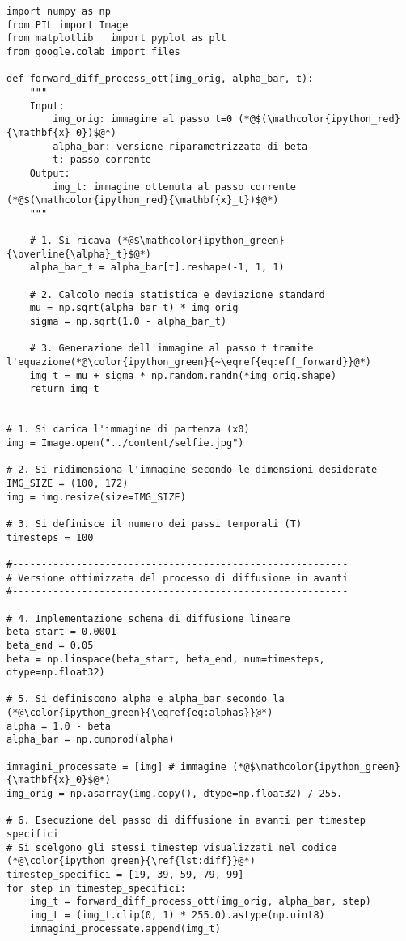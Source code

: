 \begin{lstlisting}[language=iPython,caption=Diffusione in avanti ottimizzata. Codice adattato da~\cite{nain2022},label=lst:diff_ott]
import numpy as np                 
from PIL import Image             
from matplotlib   import pyplot as plt   
from google.colab import files     
    
def forward_diff_process_ott(img_orig, alpha_bar, t):
    """
    Input:
        img_orig: immagine al passo t=0 (*@$(\mathcolor{ipython_red}{\mathbf{x}_0})$@*)
        alpha_bar: versione riparametrizzata di beta
        t: passo corrente 
    Output:
        img_t: immagine ottenuta al passo corrente (*@$(\mathcolor{ipython_red}{\mathbf{x}_t})$@*)
    """
    
    # 1. Si ricava (*@$\mathcolor{ipython_green}{\overline{\alpha}_t}$@*)
    alpha_bar_t = alpha_bar[t].reshape(-1, 1, 1)
    
    # 2. Calcolo media statistica e deviazione standard
    mu = np.sqrt(alpha_bar_t) * img_orig
    sigma = np.sqrt(1.0 - alpha_bar_t)
    
    # 3. Generazione dell'immagine al passo t tramite l'equazione(*@\color{ipython_green}{~\eqref{eq:eff_forward}}@*)
    img_t = mu + sigma * np.random.randn(*img_orig.shape)
    return img_t
  

# 1. Si carica l'immagine di partenza (x0) 
img = Image.open("../content/selfie.jpg")
  
# 2. Si ridimensiona l'immagine secondo le dimensioni desiderate
IMG_SIZE = (100, 172)
img = img.resize(size=IMG_SIZE)
  
# 3. Si definisce il numero dei passi temporali (T)
timesteps = 100

#----------------------------------------------------------
# Versione ottimizzata del processo di diffusione in avanti  
#----------------------------------------------------------

# 4. Implementazione schema di diffusione lineare
beta_start = 0.0001
beta_end = 0.05
beta = np.linspace(beta_start, beta_end, num=timesteps, dtype=np.float32)

# 5. Si definiscono alpha e alpha_bar secondo la (*@\color{ipython_green}{\eqref{eq:alphas}}@*)
alpha = 1.0 - beta
alpha_bar = np.cumprod(alpha)
  
immagini_processate = [img] # immagine (*@$\mathcolor{ipython_green}{\mathbf{x}_0}$@*)
img_orig = np.asarray(img.copy(), dtype=np.float32) / 255.

# 6. Esecuzione del passo di diffusione in avanti per timestep specifici
# Si scelgono gli stessi timestep visualizzati nel codice (*@\color{ipython_green}{\ref{lst:diff}}@*)
timestep_specifici = [19, 39, 59, 79, 99]
for step in timestep_specifici:
    img_t = forward_diff_process_ott(img_orig, alpha_bar, step)
    img_t = (img_t.clip(0, 1) * 255.0).astype(np.uint8)
    immagini_processate.append(img_t)
  


\end{lstlisting}
